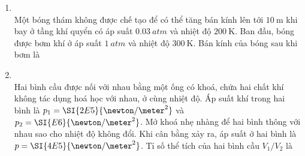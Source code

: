 \begin{enumerate}[label=\bfseries Câu \arabic*:, leftmargin=1.7cm]
\item {}\\
Một bóng thám không được chế tạo để có thể tăng bán kính lên tới $\SI{10}{\meter}$ khi bay ở tầng khí quyển có áp suất $\SI{0.03}{atm}$ và nhiệt độ $\SI{200}{\kelvin}$. Ban đầu, bóng được bơm khí ở áp suất $\SI{1}{atm}$ và nhiệt độ $\SI{300}{\kelvin}$. Bán kính của bóng sau khi bơm là



\item {}\\
Hai bình cầu được nối với nhau bằng một ống có khoá, chứa hai chất khí không tác dụng hoá học với nhau, ở cùng nhiệt độ. Áp suất khí trong hai bình là $p_1=\SI{2E5}{\newton/\meter^2}$ và $p_2=\SI{E6}{\newton/\meter^2}$. Mở khoá nhẹ nhàng để hai bình thông với nhau sao cho nhiệt độ không đổi. Khi cân bằng xảy ra, áp suất ở hai bình là $p=\SI{4E5}{\newton/\meter^2}$. Tỉ số thể tích của hai bình cầu $V_1/V_2$ là


\end{enumerate}
